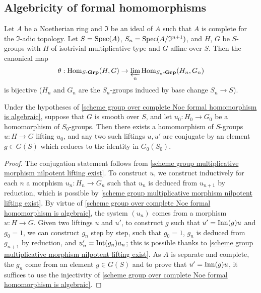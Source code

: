 \subsection{Algebricity of formal homomorphisms}
\begin{theorem}\label{scheme group over complete Noe formal homomorphism is algebraic}
Let $A$ be a Noetherian ring and $\mathfrak{I}$ be an ideal of $A$ such that $A$ is complete for the $\mathfrak{I}$-adic topology. Let $S=\mathrm{Spec}(A)$, $S_n=\mathrm{Spec}(A/\mathfrak{I}^{n+1})$, and $H$, $G$ be $S$-groups with $H$ of isotrivial multiplicative type and $G$ affine over $S$. Then the canonical map
\begin{equation}
\theta:\mathrm{Hom}_{S\textup{-}\mathbf{Grp}}(H,G)\to\varprojlim_n\mathrm{Hom}_{S_n\textup{-}\mathbf{Grp}}(H_n,G_n)
\end{equation}
is bijective ($H_n$ and $G_n$ are the $S_n$-groups induced by base change $S_n\to S$).
\end{theorem}


\begin{corollary}\label{scheme group over complete Noe morphism from multiplicative lifting exist}
Under the hypotheses of \cref{scheme group over complete Noe formal homomorphism is algebraic}, suppose that $G$ is smooth over $S$, and let $u_0:H_0\to G_0$ be a homomorphism of $S_0$-groups. Then there exists a homomorphism of $S$-groups $u:H\to G$ lifting $u_0$, and any two such liftings $u,u'$ are conjugate by an element $g\in G(S)$ which reduces to the identity in $G_0(S_0)$.
\end{corollary}
\begin{proof}
The conjugation statement follows from \cref{scheme group multiplicative morphism nilpotent lifting exist}. To construct $u$, we construct inductively for each $n$ a morphism $u_n:H_n\to G_n$ such that $u_n$ is deduced from $u_{n+1}$ by reduction, which is possible by \cref{scheme group multiplicative morphism nilpotent lifting exist}. By virtue of \cref{scheme group over complete Noe formal homomorphism is algebraic}, the system $(u_n)$ comes from a morphism $u:H\to G$. Given two liftings $u$ and $u'$, to construct $g$ such that $u'=\mathrm{Inn}(g)u$ and $g_0=1$, we can construct $g_n$ step by step, such that $g_0=1$, $g_n$ is deduced from $g_{n+1}$ by reduction, and $u'_n=\operatorname{Int}(g_n)u_n$; this is possible thanks to \cref{scheme group multiplicative morphism nilpotent lifting exist}. As $A$ is separate and complete, the $g_n$ come from an element $g\in G(S)$ and to prove that $u'=\mathrm{Inn}(g)u$, it suffices to use the injectivity of \cref{scheme group over complete Noe formal homomorphism is algebraic}. 
\end{proof}

